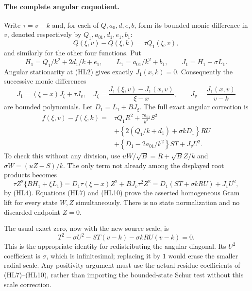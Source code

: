\paragraph{The complete angular coquotient.}
Write $\tau=v-k$ and, for each of $Q,a_0,d,e,b$, form its bounded
monic difference in $v$, denoted respectively by
$Q_1,a_{01},d_1,e_1,b_1$:
\[
 Q(\xi,v)-Q(\xi,k)=\tau Q_1(\xi,v),
\]
and similarly for the other four functions.  Put
\[
 H_1=Q_1/k^2+2d_1/k+e_1,\qquad
 L_1=a_{01}/k^2+b_1,\qquad J_1=H_1+\sigma L_1.
\]
Angular stationarity at (HL2) gives exactly $J_1(x,k)=0$.
Consequently the successive monic differences
\[
 J_1=(\xi-x)J_\xi+\tau J_v,
 \quad
 J_\xi=\frac{J_1(\xi,v)-J_1(x,v)}{\xi-x},\qquad
 J_v=\frac{J_1(x,v)}{v-k}                            \tag{HL9}
\]
are bounded polynomials.  Let $D_1=L_1+BJ_\xi$.  The full exact
angular correction is
\begin{align*}
 f(\xi,v)-f(\xi,k)={}&
 \tau Q_1R^2+\frac{\tau a_{01}}{k^2}S^2\\
 &+\left\{2(Q_1/k+d_1)+\sigma kD_1\right\}RU\\
 &+\left\{D_1-2a_{01}/k^2\right\}ST+J_vU^2.       \tag{HL10}
\end{align*}
To check this without any division, use
$uW/\sqrt B=R+\sqrt B Z/k$ and
$\sigma W=(uZ-S)/k$.  The only term not already among the displayed
root products becomes
\[
 \tau Z^2\{BH_1+\xi L_1\}
 =D_1\tau(\xi-x)Z^2+BJ_v\tau^2Z^2
 =D_1(ST+\sigma kRU)+J_vU^2,
\]
by (HL4).  Equations (HL7) and (HL10) prove the asserted homogeneous
Gram lift for every state $W,Z$ simultaneously.  There is no state
normalization and no discarded endpoint $Z=0$.

The usual exact zero, now with the new source scale, is
\[
 T^2-\sigma U^2-ST(v-k)-\sigma kRU(v-k)=0.          \tag{HL11}
\]
This is the appropriate identity for redistributing the angular
diagonal.  Its $U^2$ coefficient is $\sigma$, which is infinitesimal;
replacing it by $1$ would erase the smaller radial scale.  Any
positivity argument must use the actual residue coefficients of
(HL7)--(HL10), rather than importing the bounded-state Schur test
without this scale correction.

